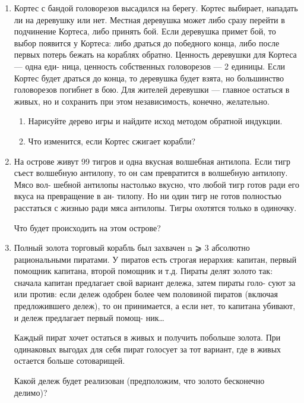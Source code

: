\documentclass[12pt]{article}
\begin{document}
\begin{enumerate}

   \item Кортес с бандой головорезов высадился на берегу. Кортес выбирает, нападать ли на деревушку
   или нет. Местная деревушка может либо сразу перейти в подчинение Кортеса, либо принять бой.
   Если деревушка примет бой, то выбор появится у Кортеса: либо драться до победного конца, либо
   после первых потерь бежать на кораблях обратно. Ценность деревушки для Кортеса — одна еди-
   ница, ценность собственных головорезов — 2 единицы. Если Кортес будет драться до конца, то
   деревушка будет взята, но большинство головорезов погибнет в бою. Для жителей деревушки —
   главное остаться в живых, но и сохранить при этом независимость, конечно, желательно.
   
   \begin{enumerate}
    \item Нарисуйте дерево игры и найдите исход методом обратной индукции.
    \item Что изменится, если Кортес сжигает корабли?
   \end{enumerate}
   
   \item На острове живут 99 тигров и одна вкусная волшебная антилопа.
   Если тигр съест волшебную антилопу, то он сам превратится в волшебную антилопу. Мясо вол-
   шебной антилопы настолько вкусно, что любой тигр готов ради его вкуса на превращение в ан-
   тилопу. Но ни один тигр не готов полностью расстаться с жизнью ради мяса антилопы. Тигры
   охотятся только в одиночку.
   
   Что будет происходить на этом острове?

   \item Полный золота торговый корабль был захвачен n ⩾ 3 абсолютно рациональными пиратами.
   У пиратов есть строгая иерархия: капитан, первый помощник капитана, второй помощник и т.д.
   Пираты делят золото так: сначала капитан предлагает свой вариант дележа, затем пираты голо-
   суют за или против: если дележ одобрен более чем половиной пиратов (включая предложившего
   дележ), то он принимается, а если нет, то капитана убивают, и дележ предлагает первый помощ-
   ник\ldots
   
   Каждый пират хочет остаться в живых и получить побольше золота. При одинаковых выгодах
   для себя пират голосует за тот вариант, где в живых остается больше сотоварищей.
   
   Какой дележ будет реализован (предположим, что золото бесконечно делимо)?
   

\end{enumerate}
\end{document}
